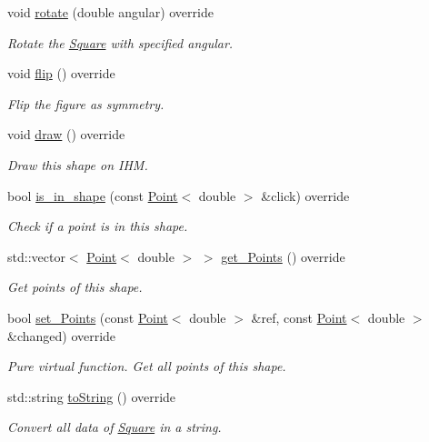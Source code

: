 \begin{DoxyCompactItemize}
void \hyperlink{classSquare_a5714e182c30f996b78e74e1badd054a2}{rotate} (double angular) override
\begin{DoxyCompactList}\small\item\em Rotate the \hyperlink{classSquare}{Square} with specified angular. \end{DoxyCompactList}\item 
\mbox{\label{classSquare_a2d56ff842244af8f2fdc85b7e5ce76f3}} 
void \hyperlink{classSquare_a2d56ff842244af8f2fdc85b7e5ce76f3}{flip} () override
\begin{DoxyCompactList}\small\item\em Flip the figure as symmetry. \end{DoxyCompactList}\item 
\mbox{\label{classSquare_a4edbdf9ae0519cc1823f4dbbaa6bbf4c}} 
void \hyperlink{classSquare_a4edbdf9ae0519cc1823f4dbbaa6bbf4c}{draw} () override
\begin{DoxyCompactList}\small\item\em Draw this shape on I\+HM. \end{DoxyCompactList}\item 
bool \hyperlink{classSquare_ada046df2d9fb92286d106d4b3475980a}{is\+\_\+in\+\_\+shape} (const \hyperlink{classPoint}{Point}$<$ double $>$ \&click) override
\begin{DoxyCompactList}\small\item\em Check if a point is in this shape. \end{DoxyCompactList}\item 
std\+::vector$<$ \hyperlink{classPoint}{Point}$<$ double $>$ $>$ \hyperlink{classSquare_a2a8fb1bfd2f3464cee813ec8b277506e}{get\+\_\+\+Points} () override
\begin{DoxyCompactList}\small\item\em Get points of this shape. \end{DoxyCompactList}\item 
bool \hyperlink{classSquare_ac474644483fa85f7a4f39969f34868fe}{set\+\_\+\+Points} (const \hyperlink{classPoint}{Point}$<$ double $>$ \&ref, const \hyperlink{classPoint}{Point}$<$ double $>$ \&changed) override
\begin{DoxyCompactList}\small\item\em Pure virtual function. Get all points of this shape. \end{DoxyCompactList}\item 
std\+::string \hyperlink{classSquare_aa5d7db8004bba3c400f57513d93b21d4}{to\+String} () override
\begin{DoxyCompactList}\small\item\em Convert all data of \hyperlink{classSquare}{Square} in a string. \end{DoxyCompactList}\end{DoxyCompactItemize}
